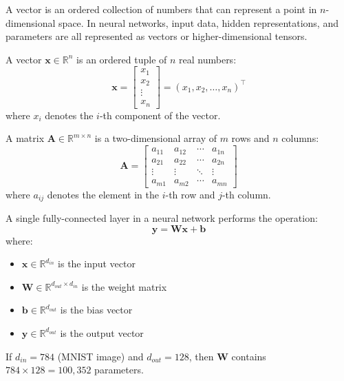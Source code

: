 A vector is an ordered collection of numbers that can represent a point in $n$-dimensional space. In neural networks, input data, hidden representations, and parameters are all represented as vectors or higher-dimensional tensors.

\begin{definition}[Vector]
A vector $\mathbf{x} \in \mathbb{R}^n$ is an ordered tuple of $n$ real numbers:
\begin{equation}
\mathbf{x} = \begin{bmatrix} x_1 \\ x_2 \\ \vdots \\ x_n \end{bmatrix} = (x_1, x_2, \ldots, x_n)^\top
\end{equation}
where $x_i$ denotes the $i$-th component of the vector.
\end{definition}

\begin{definition}[Matrix]
A matrix $\mathbf{A} \in \mathbb{R}^{m \times n}$ is a two-dimensional array of $m$ rows and $n$ columns:
\begin{equation}
\mathbf{A} = \begin{bmatrix}
a_{11} & a_{12} & \cdots & a_{1n} \\
a_{21} & a_{22} & \cdots & a_{2n} \\
\vdots & \vdots & \ddots & \vdots \\
a_{m1} & a_{m2} & \cdots & a_{mn}
\end{bmatrix}
\end{equation}
where $a_{ij}$ denotes the element in the $i$-th row and $j$-th column.
\end{definition}

\begin{example}
A single fully-connected layer in a neural network performs the operation:
\begin{equation}
\mathbf{y} = \mathbf{W}\mathbf{x} + \mathbf{b}
\end{equation}
where:
\begin{itemize}
    \item $\mathbf{x} \in \mathbb{R}^{d_{in}}$ is the input vector
    \item $\mathbf{W} \in \mathbb{R}^{d_{out} \times d_{in}}$ is the weight matrix
    \item $\mathbf{b} \in \mathbb{R}^{d_{out}}$ is the bias vector
    \item $\mathbf{y} \in \mathbb{R}^{d_{out}}$ is the output vector
\end{itemize}
If $d_{in} = 784$ (MNIST image) and $d_{out} = 128$, then $\mathbf{W}$ contains $784 \times 128 = 100,352$ parameters.
\end{example}

